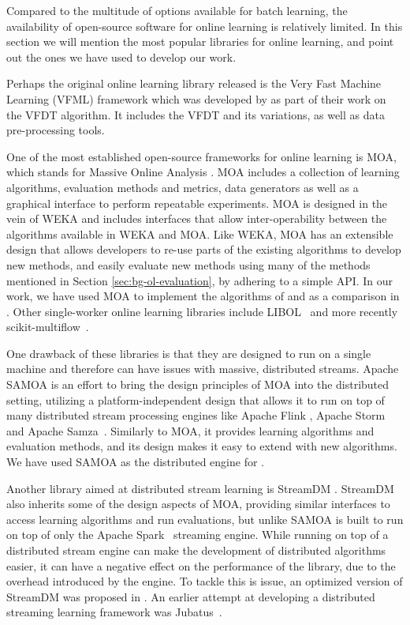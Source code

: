Compared to the multitude of options available for batch learning,  the availability
of open-source software for online learning is relatively limited. In this section we will
mention the most popular libraries for online learning, and point out the ones we have used to develop
our work.

Perhaps the original online learning library released is the Very Fast Machine Learning (VFML) framework which was developed by \citet{vfdt} as part of their work on the VFDT algorithm.
It includes the VFDT and its variations, as well as data pre-processing tools.

One of the most established open-source frameworks for online learning is MOA, which stands
for Massive Online Analysis \cite{bifet2010moa}. MOA includes a collection of
learning algorithms, evaluation methods and metrics, data generators as well as
a graphical interface to perform repeatable experiments. MOA is designed in the
vein of WEKA \cite{weka} and includes interfaces that allow inter-operability
between the algorithms available in WEKA and MOA. Like WEKA, MOA has an extensible
design that allows developers to re-use parts of the existing algorithms to develop
new methods, and easily evaluate new methods using many of the methods mentioned
in Section \ref{sec:bg-ol-evaluation}, by adhering to a simple API. In our work,
we have used MOA to implement the algorithms of \uncertaintrees and as a comparison
in \boostvht. Other single-worker online learning libraries
include LIBOL~\cite{libol} and more recently scikit-multiflow~\cite{sk-multiflow}.

One drawback of these libraries is that they are designed to run on a single machine and therefore
can have issues with massive, distributed streams. Apache SAMOA \cite{samoa} is an effort
to bring the design principles of MOA into the distributed setting, utilizing a platform-independent
design that allows it to run on top of many distributed stream processing engines like
Apache Flink \cite{flink}, Apache Storm~\cite{storm} and Apache Samza~\cite{samza}.
Similarly to MOA, it provides learning algorithms and evaluation methods, and its
design makes it easy to extend with new algorithms.
We have used SAMOA as the distributed engine for \boostvht.

Another library aimed at distributed stream learning is StreamDM \cite{streamdm}.
StreamDM also inherits some of the design aspects of MOA, providing similar interfaces
to access learning algorithms and run evaluations, but unlike SAMOA
is built to run on top of only the Apache Spark~\cite{spark} streaming engine.
While running on top of a distributed stream engine can make the development
of distributed algorithms easier, it can have a negative effect on the
performance of the library, due to the overhead introduced by the
engine. To tackle this is issue, an optimized version of StreamDM
was proposed in \cite{streamdmPP}. An earlier attempt at developing
a distributed streaming learning framework was Jubatus~\cite{jubatus}.

